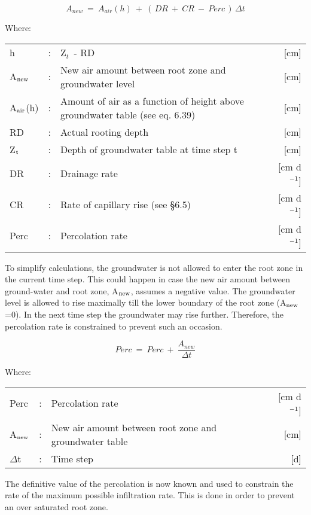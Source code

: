 \begin{equation}
 A_{new} ~=~ A_{air} (h) ~+~ (\, DR ~+~ CR ~-~ Perc\, )\, \Delta t
\end{equation}

Where:\\[5pt]
\begin{tabularx}{\textwidth}{llXr}
h &:& Z$_{t~}$ - RD & [cm]\\
A$_{{\rm new}}$ &:& New air amount between root zone and groundwater level  & [cm]\\
A$_{{\rm air}}$(h) &:& Amount of air as a function of height above groundwater
   table  (see eq. 6.39) & [cm]\\
RD &:& Actual rooting depth  & [cm]\\
Z$_{{\rm t}}$ &:& Depth of groundwater table at time step t  & [cm]\\
DR &:& Drainage rate  & [cm d$^{{\rm -1}}$]\\
CR &:& Rate of capillary rise (see \S 6.5)  & [cm d$^{{\rm -1}}$]\\
Perc &:& Percolation rate  & [cm d$^{{\rm -1}}$]\\
\end{tabularx}

To simplify calculations, the groundwater is not allowed to enter the root zone in the
current time step. This could happen in case the new air amount between ground-water
and root zone, A$_{{\rm new}}$, assumes a negative value. The groundwater level is allowed to rise
maximally till the lower boundary of the root zone (A$_{{\rm new}}$=0). In the next time step the
groundwater may rise further. Therefore, the percolation rate is con\-strained to prevent
such an occasion. 

\begin{equation}
Perc ~=~Perc ~+~{\frac{A _{new} }{\Delta t}}
\end{equation}

Where:\\[5pt]
\begin{tabularx}{\textwidth}{llXr}
Perc &:& Percolation rate   & [cm d$^{{\rm -1}}$]\\
A$_{{\rm new}}$ &:& New air amount between root zone and groundwater table  & [cm]\\
$\Delta$t &:& Time step  & [d]\\
\end{tabularx}

The definitive value of the percolation is now known and used to constrain the rate of the
maximum possible infiltra\-tion rate. This is done in order to prevent an over saturated root
zone.


